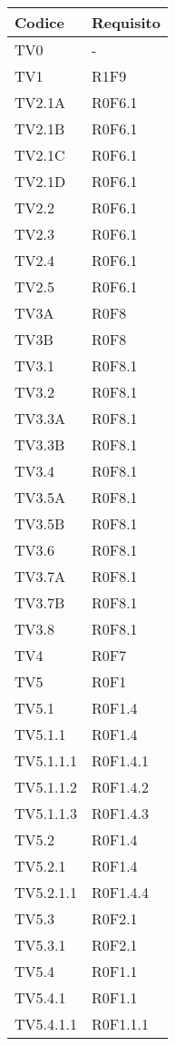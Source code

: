 \documentclass[PianoDiQualifica.tex]{subfiles}
\begin{document}
\newpage
{}
\begin{longtable}[H]{P{6.5cm}P{7cm}}
	\color{CHeaderText}\textbf{Codice} & 
	\color{CHeaderText}\textbf{Requisito} \\
	\endhead
	TV0  & - \\
	TV1  & R1F9 \\
	TV2.1A  & R0F6.1 \\
	TV2.1B  & R0F6.1 \\
	TV2.1C  & R0F6.1 \\
	TV2.1D  & R0F6.1 \\
	TV2.2 &  R0F6.1 \\ 
	TV2.3 &  R0F6.1 \\ 
	TV2.4 &  R0F6.1 \\ 
	TV2.5 &  R0F6.1 \\ 
	TV3A  & R0F8 \\ 
	TV3B  & R0F8 \\ 
	TV3.1  & R0F8.1 \\ 
	TV3.2  & R0F8.1 \\ 
	TV3.3A  & R0F8.1 \\ 
	TV3.3B  & R0F8.1 \\ 
	TV3.4  & R0F8.1 \\ 
	TV3.5A  & R0F8.1 \\ 
	TV3.5B  & R0F8.1 \\ 
	TV3.6  & R0F8.1 \\ 
	TV3.7A  & R0F8.1 \\ 
	TV3.7B  & R0F8.1 \\ 
	TV3.8  & R0F8.1 \\ 
	TV4  & R0F7 \\ 
	TV5  & R0F1 \\ 
	TV5.1  & R0F1.4 \\ 
	TV5.1.1 &  R0F1.4  \\ 
	TV5.1.1.1  &  R0F1.4.1 \\ 
	TV5.1.1.2  & R0F1.4.2 \\ 
	TV5.1.1.3  & R0F1.4.3 \\ 
	TV5.2  & R0F1.4 \\ 
	TV5.2.1  & R0F1.4 \\ 
	TV5.2.1.1  & R0F1.4.4 \\ 
	TV5.3  & R0F2.1 \\ 
	TV5.3.1  & R0F2.1 \\ 
	TV5.4  & R0F1.1 \\ 
	TV5.4.1  & R0F1.1 \\ 
	TV5.4.1.1  & R0F1.1.1 \\ 

\end{longtable}
\end{document}
